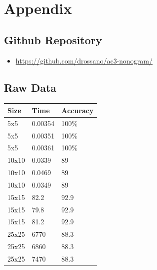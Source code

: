 \documentclass[12pt, letterpaper]
{article}
\begin{document}
\pagebreak
\appendix
\section{Appendix}
\subsection{Github Repository}
\begin{itemize}
 \item \href{https://github.com/drossano/ac3-nonogram/}{https://github.com/drossano/ac3-nonogram/}
\end{itemize}
\subsection{Raw Data}
\begin{table}[!ht]
    \centering
    \begin{tabular}{lll}
    \hline
        \textbf{Size} & \textbf{Time} & \textbf{Accuracy} \\ \hline
        5x5 & 0.00354 & 100\% \\ 
        5x5 & 0.00351 & 100\% \\ 
        5x5 & 0.00361 & 100\% \\ 
        10x10 & 0.0339 & 89 \\ 
        10x10 & 0.0469 & 89 \\ 
        10x10 & 0.0349 & 89 \\ 
        15x15 & 82.2 & 92.9 \\ 
        15x15 & 79.8 & 92.9 \\ 
        15x15 & 81.2 & 92.9 \\ 
        25x25 & 6770 & 88.3 \\ 
        25x25 & 6860 & 88.3 \\ 
        25x25 & 7470 & 88.3 \\ \hline
    \end{tabular}
\end{table}

% 

% 




\end{document}
